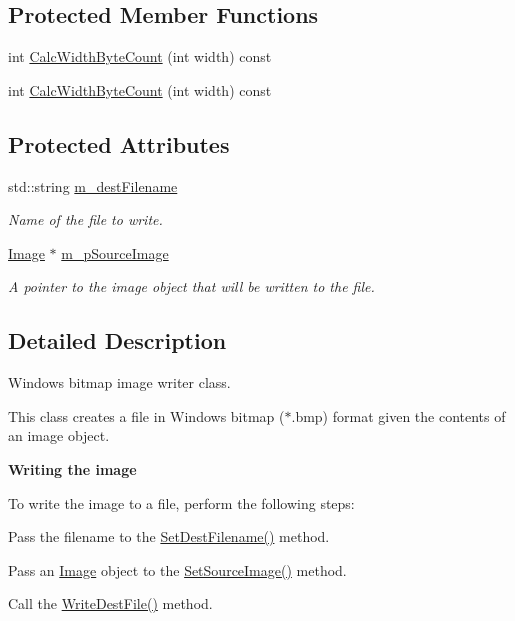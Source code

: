 \subsection*{Protected Member Functions}
\begin{DoxyCompactItemize}
\item 
int \hyperlink{classnoise_1_1utils_1_1_writer_b_m_p_a1011299eb00f7bcceef198053a5170f4}{Calc\+Width\+Byte\+Count} (int width) const 
\item 
int \hyperlink{classnoise_1_1utils_1_1_writer_b_m_p_ab230ad020bce77c18a9ceadb7a297b50}{Calc\+Width\+Byte\+Count} (int width) const 
\end{DoxyCompactItemize}
\subsection*{Protected Attributes}
\begin{DoxyCompactItemize}
\item 
std\+::string \hyperlink{classnoise_1_1utils_1_1_writer_b_m_p_a2cfd3c61d9db75807eb516626e35d4fd}{m\+\_\+dest\+Filename}
\begin{DoxyCompactList}\small\item\em Name of the file to write. \end{DoxyCompactList}\item 
\hyperlink{classnoise_1_1utils_1_1_image}{Image} $\ast$ \hyperlink{classnoise_1_1utils_1_1_writer_b_m_p_a0023dafca9882acd3702fb8f47781b9b}{m\+\_\+p\+Source\+Image}
\begin{DoxyCompactList}\small\item\em A pointer to the image object that will be written to the file. \end{DoxyCompactList}\end{DoxyCompactItemize}


\subsection{Detailed Description}
Windows bitmap image writer class.

This class creates a file in Windows bitmap ($\ast$.bmp) format given the contents of an image object.

{\bfseries Writing the image}

To write the image to a file, perform the following steps\+:
\begin{DoxyItemize}
\item Pass the filename to the \hyperlink{classnoise_1_1utils_1_1_writer_b_m_p_a02ef2f6be88d1636bac1d3bf0c598393}{Set\+Dest\+Filename()} method.
\item Pass an \hyperlink{classnoise_1_1utils_1_1_image}{Image} object to the \hyperlink{classnoise_1_1utils_1_1_writer_b_m_p_a62957bc808604c20d0388212777a1b4b}{Set\+Source\+Image()} method.
\item Call the \hyperlink{classnoise_1_1utils_1_1_writer_b_m_p_adb6cc4cb2b5ce8ba4240ebfd54ad631c}{Write\+Dest\+File()} method.
\end{DoxyItemize}

